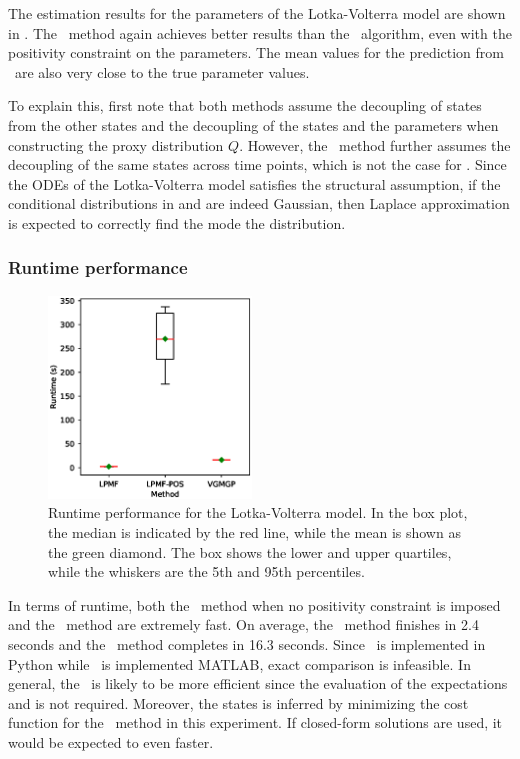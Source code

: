 The estimation results for the parameters of the Lotka-Volterra model are shown in .
The \algolpmf\ method again achieves better results than the \algovgmgp\ algorithm, even with the positivity constraint on the parameters.
The mean values for the prediction from \algolpmf\ are also very close to the true parameter values.

To explain this, first note that both methods assume the decoupling of states from the other states and the decoupling of the states and the parameters when constructing the proxy distribution $Q$.
However, the \algovgmgp\ method further assumes the decoupling of the same states across time points, which is not the case for \algolpmf.
Since the ODEs of the Lotka-Volterra model satisfies the structural assumption, if the conditional distributions in  and  are indeed Gaussian, then Laplace approximation is expected to correctly find the mode the distribution.

\subsubsection*{Runtime performance}

\begin{figure}
    \centering
    \includegraphics[width=0.48\textwidth]{graphics/lotka-runtime-boxplot}
    \caption{Runtime performance for the Lotka-Volterra model. In the box plot, the median is indicated by the red line, while the mean is shown as the green diamond. The box shows the lower and upper quartiles, while the whiskers are the 5th and 95th percentiles.}
    \label{fig-lotka-runtime-boxplot}
\end{figure}

In terms of runtime, both the \algolpmf\ method when no positivity constraint is imposed and the \algovgmgp\ method are extremely fast.
On average, the \algolpmf\ method finishes in 2.4 seconds and the \algovgmgp\ method completes in 16.3 seconds.
Since \algolpmf\ is implemented in Python while \algovgmgp\ is implemented MATLAB, exact comparison is infeasible.
In general, the \algolpmf\ is likely to be more efficient since the evaluation of the expectations  and  is not required.
Moreover, the states is inferred by minimizing the cost function for the \algolpmf\ method in this experiment.
If closed-form solutions are used, it would be expected to even faster.


